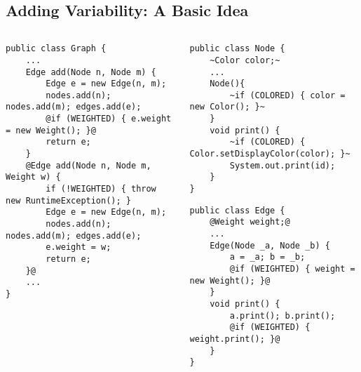 \subsection{Adding Variability: A Basic Idea}
\begin{frame}[fragile]{\insertsubsection}
		\begin{columns}
				\vspace{5mm}
\begin{tiny}
\begin{lstlisting}
public class Graph {
	...
	Edge add(Node n, Node m) {
		Edge e = new Edge(n, m);
		nodes.add(n); nodes.add(m); edges.add(e);
		@if (WEIGHTED) { e.weight = new Weight(); }@
		return e;
	}
	@Edge add(Node n, Node m, Weight w) {
		if (!WEIGHTED) { throw new RuntimeException(); }
		Edge e = new Edge(n, m);
		nodes.add(n); nodes.add(m); edges.add(e);
		e.weight = w;
		return e;
	}@
	...
}
\end{lstlisting}
\end{tiny}	
\begin{tiny}
\begin{lstlisting}
public class Node {
	~Color color;~
	...
	Node(){
		~if (COLORED) { color = new Color(); }~
	}
	void print() {
		~if (COLORED) { Color.setDisplayColor(color); }~
		System.out.print(id);
	}
}
\end{lstlisting}
\begin{lstlisting}
public class Edge {
	@Weight weight;@ 
	...
	Edge(Node _a, Node _b) {
		a = _a; b = _b;
		@if (WEIGHTED) { weight = new Weight(); }@
	}
	void print() {
		a.print(); b.print();
		@if (WEIGHTED) { weight.print(); }@
	}
}
\end{lstlisting}
\end{tiny}	
		\end{columns}
\end{frame}

